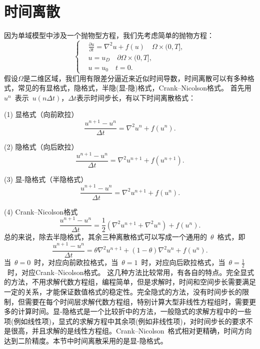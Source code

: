\documentclass[twoside,UTF8]{nputhesis}
\begin{document}
\section{时间离散}
因为单域模型中涉及一个抛物型方程，我们先考虑简单的抛物方程：
\begin{equation*}
\left\{\begin{aligned}&\frac{\partial u}{\partial t}=\nabla^{2}u+f(u) \quad\Omega\times(0,T],\\&u=u_D \quad\partial\Omega\times(0,T],\\&u=u_0\quad t=0.\end{aligned}\right.
\label{1.1}
\end{equation*}
假设$\Omega$是二维区域，我们用有限差分逼近来近似时间导数，时间离散可以有多种格式，常见的有显格式，隐格式，半隐(显-隐)格式，Crank–Nicolson格式。
首先用~$u^n$~表示~$u(n\Delta t)$，$\Delta t$表示时间步长，有以下时间离散格式：

(1) 显格式（向前欧拉）
\begin{equation}
\frac{u^{n+1}-u^n}{\Delta t}=\nabla^2u^{n}+f(u^{n}).
\end{equation}

(2) 隐格式（向后欧拉）
\begin{equation}
\frac{u^{n+1}-u^n}{\Delta t}=\nabla^2u^{n+1}+f(u^{n+1}).
\end{equation}

(3) 显-隐格式（半隐格式）
\begin{equation}
\frac{u^{n+1}-u^n}{\Delta t}=\nabla^2u^{n+1}+f(u^{n}).
\end{equation}

(4) Crank–Nicolson格式
\begin{equation}
\frac{u^{n+1}-u^n}{\Delta t}=\frac{1}{2}(\nabla^2u^{n+1}+\nabla^2u^{n})+f(u^{n}).
\end{equation}
总的来说，除去半隐格式，其余三种离散格式可以写成一个通用的~$\theta$~格式，即
\begin{equation}
\frac{u^{n+1}-u^n}{\Delta t}=\theta\nabla^2u^{n+1}+(1-\theta)\nabla^2u^{n}+f(u^{n}).
\end{equation}
当~$\theta=0$~时，对应向前欧拉格式，当~$\theta=1$~时，对应向后欧拉格式，当~$\theta=\frac{1}{2}$~时，对应Crank–Nicolson格式。
这几种方法比较常用，有各自的特点。完全显式的方法，不用求解代数方程组，编程简单，但是求解时，时间和空间步长需要满足一定的关系，才能保证数值格式的稳定性。完全隐式的方法，没有时间步长的限制，但需要在每个时间层求解代数方程组，特别计算大型非线性方程组时，需要更多的计算时间。显-隐格式是一个比较折中的方法，一般隐式的求解方程中的一些项(例如线性项)，显式的求解方程中其余项(例如非线性项)，对时间步长的要求不是很高，并且求解的是线性方程组。Crank–Nicolson~格式相对更精确，时间方向达到二阶精度。本节中时间离散采用的是显-隐格式。
\end{document}
